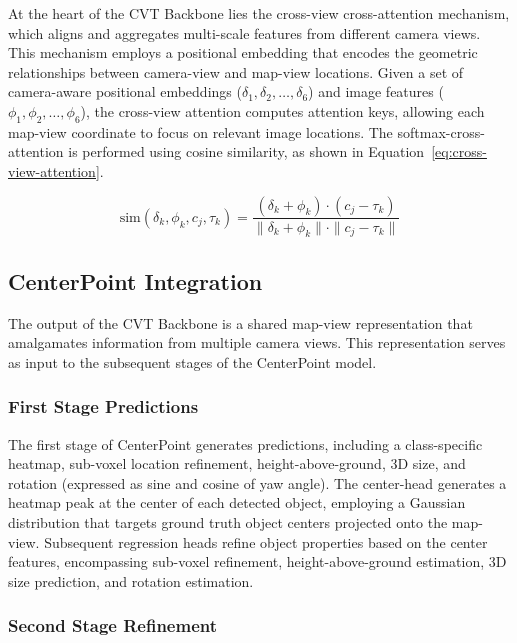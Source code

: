 \documentclass[times, report, parskip, openbib, twocolumn]{article}
\begin{document}
At the heart of the CVT Backbone lies the cross-view cross-attention mechanism, which aligns and aggregates multi-scale features from different camera views. This mechanism employs a positional embedding that encodes the geometric relationships between camera-view and map-view locations. Given a set of camera-aware positional embeddings (\(\delta_1, \delta_2, \ldots, \delta_6\)) and image features (\(\phi_1, \phi_2, \ldots, \phi_6\)), the cross-view attention computes attention keys, allowing each map-view coordinate to focus on relevant image locations. The softmax-cross-attention is performed using cosine similarity, as shown in Equation~\ref{eq:cross-view-attention}.

\begin{equation}
    \text{sim}(\delta_k, \phi_k, c_j, \tau_k) = \frac{(\delta_k + \phi_k) \cdot (c_j - \tau_k)}{\|\delta_k + \phi_k\| \cdot \|c_j - \tau_k\|}
    \label{eq:cross-view-attention}
\end{equation}

\subsection{CenterPoint Integration}

The output of the CVT Backbone is a shared map-view representation that amalgamates information from multiple camera views. This representation serves as input to the subsequent stages of the CenterPoint model.

\subsubsection{First Stage Predictions}

The first stage of CenterPoint generates predictions, including a class-specific heatmap, sub-voxel location refinement, height-above-ground, 3D size, and rotation (expressed as sine and cosine of yaw angle). The center-head generates a heatmap peak at the center of each detected object, employing a Gaussian distribution that targets ground truth object centers projected onto the map-view. Subsequent regression heads refine object properties based on the center features, encompassing sub-voxel refinement, height-above-ground estimation, 3D size prediction, and rotation estimation.

\subsubsection{Second Stage Refinement}
\end{document}
